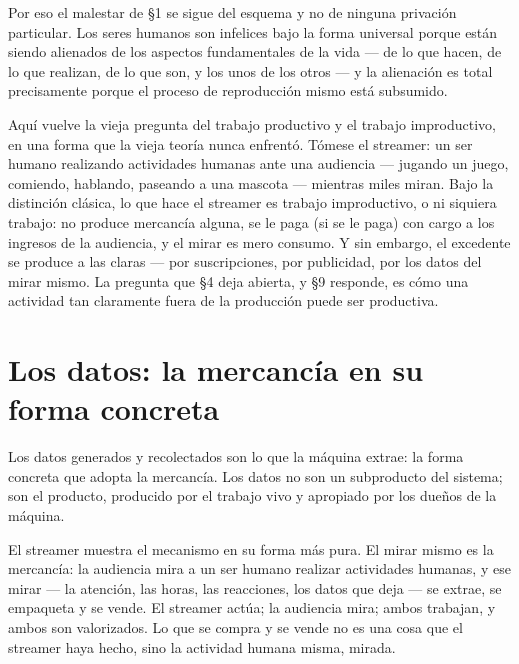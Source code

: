 \documentclass[11pt]{article}
\begin{document}
Por eso el malestar de §1 se sigue del esquema y no de ninguna
privación particular. Los seres humanos son infelices bajo la forma
universal porque están siendo alienados de los aspectos fundamentales de
la vida --- de lo que hacen, de lo que realizan, de lo que son, y los
unos de los otros --- y la alienación es total precisamente porque el
proceso de reproducción mismo está subsumido.

Aquí vuelve la vieja pregunta del trabajo productivo y el trabajo
improductivo, en una forma que la vieja teoría nunca enfrentó. Tómese
el streamer: un ser humano realizando actividades humanas ante una
audiencia --- jugando un juego, comiendo, hablando, paseando a una
mascota --- mientras miles miran. Bajo la distinción clásica, lo que
hace el streamer es trabajo improductivo, o ni siquiera trabajo: no
produce mercancía alguna, se le paga (si se le paga) con cargo a los
ingresos de la audiencia, y el mirar es mero consumo. Y sin embargo, el
excedente se produce a las claras --- por suscripciones, por publicidad,
por los datos del mirar mismo. La pregunta que §4 deja abierta, y §9
responde, es cómo una actividad tan claramente fuera de la producción
puede ser productiva.

\section{Los datos: la mercancía en su forma concreta}

Los datos generados y recolectados son lo que la máquina extrae: la
forma concreta que adopta la mercancía. Los datos no son un subproducto
del sistema; son el producto, producido por el trabajo vivo y apropiado
por los dueños de la máquina.

El streamer muestra el mecanismo en su forma más pura. El mirar mismo
es la mercancía: la audiencia mira a un ser humano realizar actividades
humanas, y ese mirar --- la atención, las horas, las reacciones, los
datos que deja --- se extrae, se empaqueta y se vende. El streamer
actúa; la audiencia mira; ambos trabajan, y ambos son valorizados. Lo
que se compra y se vende no es una cosa que el streamer haya hecho,
sino la actividad humana misma, mirada.
\end{document}
